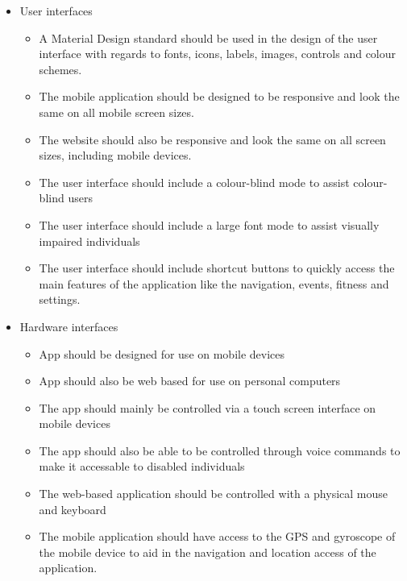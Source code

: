 \documentclass{article}
\begin{document}
		\begin{itemize}
			\item User interfaces
				\begin{itemize}
					\item A Material Design standard should be used in the design of the user interface with regards to fonts, icons, labels, images, controls and colour schemes.
					\item The mobile application should be designed to be responsive and look the same on all mobile screen sizes.
					\item The website should also be responsive and look the same on all screen sizes, including mobile devices.
					\item The user interface should include a colour-blind mode to assist colour-blind users
					\item The user interface should include a large font mode to assist visually impaired individuals
					\item The user interface should include shortcut buttons to quickly access the main features of the application like the navigation, events, fitness and settings.
				\end{itemize}
				
			\item Hardware interfaces
				\begin{itemize}
					\item App should be designed for use on mobile devices
					\item App should also be web based for use on personal computers
					\item The app should mainly be controlled via a touch screen interface on mobile devices
					\item The app should also be able to be controlled through voice commands to make it accessable to disabled individuals
					\item The web-based application should be controlled with a physical mouse and keyboard
					\item The mobile application should have access to the GPS and gyroscope of the mobile device to aid in the navigation and location access of the application.
				\end{itemize}


\end{itemize}
\end{document}
